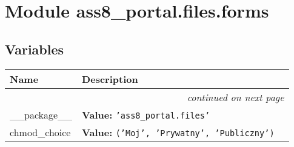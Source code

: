 %
%
%


\section{Module ass8\_portal.files.forms}

    \label{ass8_portal:files:forms}


  \subsection{Variables}

    \vspace{-1cm}
\hspace{\varindent}\begin{longtable}{|p{\varnamewidth}|p{\vardescrwidth}|l}
\cline{1-2}
\cline{1-2} \centering \textbf{Name} & \centering \textbf{Description}& \\
\cline{1-2}
\endhead\cline{1-2}\multicolumn{3}{r}{\small\textit{continued on next page}}\\\endfoot\cline{1-2}
\endlastfoot\raggedright \_\-\_\-p\-a\-c\-k\-a\-g\-e\-\_\-\_\- & \raggedright \textbf{Value:} 
{\tt \texttt{'}\texttt{ass8\_portal.files}\texttt{'}}&\\
\cline{1-2}
\raggedright c\-h\-m\-o\-d\-\_\-c\-h\-o\-i\-c\-e\- & \raggedright \textbf{Value:} 
{\tt \texttt{(}\texttt{'}\texttt{Moj}\texttt{'}\texttt{, }\texttt{'}\texttt{Prywatny}\texttt{'}\texttt{, }\texttt{'}\texttt{Publiczny}\texttt{'}\texttt{)}}&\\
\cline{1-2}
\end{longtable}



